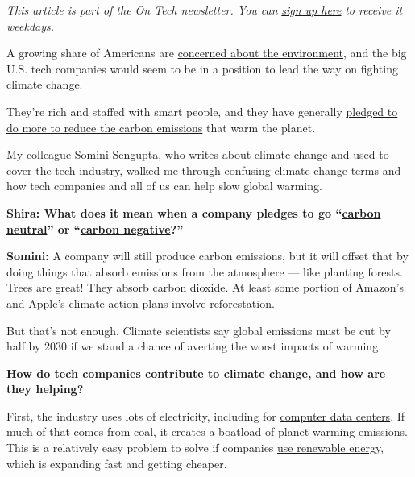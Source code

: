 \emph{This article is part of the On Tech newsletter. You can}
\href{https://www.nytimes3xbfgragh.onion/newsletters/signup/OT}{\emph{sign
up here}} \emph{to receive it weekdays.}

A growing share of Americans are
\href{https://www.nytimes3xbfgragh.onion/2020/07/17/briefing/coronavirus-brian-kemp-washington-redskins-your-friday-briefing.html}{concerned
about the environment}, and the big U.S. tech companies would seem to be
in a position to lead the way on fighting climate change.

They're rich and staffed with smart people, and they have generally
\href{https://www.nytimes3xbfgragh.onion/2020/07/21/climate/apple-emissions-pledge.html}{pledged
to do more to reduce the carbon emissions} that warm the planet.

My colleague
\href{https://www.nytimes3xbfgragh.onion/by/somini-sengupta}{Somini
Sengupta}, who writes about climate change and used to cover the tech
industry, walked me through confusing climate change terms and how tech
companies and all of us can help slow global warming.

\textbf{Shira: What does it mean when a company pledges to go
``\href{https://www.apple.com/newsroom/2020/07/apple-commits-to-be-100-percent-carbon-neutral-for-its-supply-chain-and-products-by-2030/}{carbon
neutral}'' or
``\href{https://blogs.microsoft.com/on-the-issues/2020/07/21/carbon-negative-transform-to-net-zero/}{carbon
negative}?''}

\textbf{Somini:} A company will still produce carbon emissions, but it
will offset that by doing things that absorb emissions from the
atmosphere --- like planting forests. Trees are great! They absorb
carbon dioxide. At least some portion of Amazon's and Apple's climate
action plans involve reforestation.

But that's not enough. Climate scientists say global emissions must be
cut by half by 2030 if we stand a chance of averting the worst impacts
of warming.

\textbf{How do tech companies contribute to climate change, and how are
they helping?}

First, the industry uses lots of electricity, including for
\href{https://www.nytimes3xbfgragh.onion/2020/07/08/technology/internet-infrastructure.html}{computer
data centers}. If much of that comes from coal, it creates a boatload of
planet-warming emissions. This is a relatively easy problem to solve if
companies
\href{https://aws.amazon.com/about-aws/sustainability/sustainability-timeline/}{use
renewable energy}, which is expanding fast and getting cheaper.

